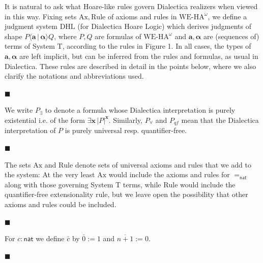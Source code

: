 It is natural to ask what Hoare-like rules govern Dialectica realizers when viewed in this way. Fixing sets $\mathrm{Ax},\mathrm{Rule}$ of axioms and rules in $\mathrm{WE}\mbox{-}\mathrm{HA}^{\omega}$, we define a judgment system $\mathrm{DHL}$ (for Dialectica Hoare Logic) which derives judgments of shape $P\langle{\bm{a}}\,|\,{\bm{\alpha}}\rangle Q$, where $P,Q$ are formulas of $\mathrm{WE}\mbox{-}\mathrm{HA}^{\omega}$ and $\bm{a},\bm{\alpha}$ are (sequences of) terms of System T, according to the rules in Figure 1. In all cases, the types of $\bm{a},\bm{\alpha}$ are left implicit, but can be inferred from the rules and formulas, as usual in Dialectica. These rules are described in detail in the points below, where we also clarify the notations and abbreviations used.\par
 
 
  
\par\noindent  $\blacksquare$ 
 
We write $P_{\exists}$ to denote a formula whose Dialectica interpretation is purely existential i.e. of the form $\exists\bm{x}\,|{P}|^{\bm{x}}$. Similarly, $P_{\forall}$ and $P_{qf}$ mean that the Dialectica interpretation of $P$ is purely universal resp. quantifier-free.\par
 
 
 
\par\noindent  $\blacksquare$ 
 
The sets $\mathrm{Ax}$ and $\mathrm{Rule}$ denote sets of universal axioms and rules that we add to the system: At the very least $\mathrm{Ax}$ would include the axioms and rules for $=_{\mathsf{nat}}$ along with those governing System T terms, while $\mathrm{Rule}$ would include the quantifier-free extensionality rule, but we leave open the possibility that other axioms and rules could be included.\par
 
 
 
\par\noindent  $\blacksquare$ 
 
For $c:\mathsf{nat}$ we define $\bar{c}$ by $\bar{0}:=1$ and $\overline{n+1}:=0$.\par
 
 
 
\par\noindent  $\blacksquare$ 
 
